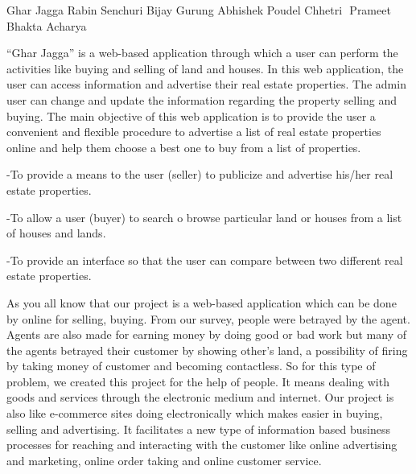  \begin{conf-abstract}[]
 {Ghar Jagga }
 { Rabin Senchuri
 	Bijay Gurung
 	Abhishek Poudel Chhetri  
 	Prameet Bhakta Acharya
 }
{}

 “Ghar Jagga” is a web-based application through which a user can perform the activities like buying and selling of land and houses. In this web application, the user can access information and advertise their real estate properties. The admin user can change and update the information regarding the property selling and buying. The main objective of this web application is to provide the user a convenient and flexible procedure to advertise a list of real estate properties online and help them choose a best one to buy from a list of properties.
 
 -To provide a means to the user (seller) to publicize and advertise his/her real estate properties.
 
 -To allow a user (buyer) to search o browse particular land or houses from a list of houses and lands.
 
 -To provide an interface so that the user can compare between two different real estate properties.
 
 As you all know that our project is a web-based application which can be done by online for selling, buying. From our survey, people were betrayed by the agent. Agents are also made for earning money by doing good or bad work but many of the agents betrayed their customer by showing other’s land, a possibility of firing by taking money of customer and becoming contactless. So for this type of problem, we created this project for the help of people. It means dealing with goods and services through the electronic medium and internet. Our project is also like e-commerce sites doing electronically which makes easier in buying, selling and advertising. It facilitates a new type of information based business processes for reaching and interacting with the customer like online advertising and marketing, online order taking and online customer service. 
 
\end{conf-abstract}

